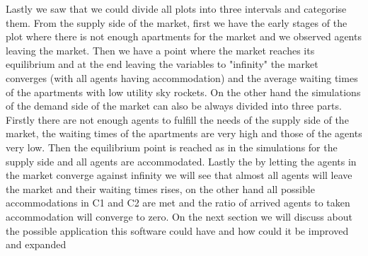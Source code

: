 Lastly we saw that we could divide all plots into three intervals and categorise them. From the supply side of the market, first we have the early stages of the plot where there is not enough apartments for the market and we observed agents leaving the market. Then we have a point where the market reaches its equilibrium and at the end leaving the variables to "infinity" the market converges (with all agents having accommodation) and the average waiting times of the apartments with low utility sky rockets. On the other hand the simulations of the demand side of the market can also be always divided into three parts. Firstly there are not enough agents to fulfill the needs of the supply side of the market, the waiting times of the apartments are very high and those of the agents very low. Then the equilibrium point is reached as in the simulations for the supply side and all agents are accommodated. Lastly the by letting the agents in the market converge against infinity we will see that almost all agents will leave the market and their waiting times rises, on the other hand all possible accommodations in C1 and C2 are met and the ratio of arrived agents to taken accommodation will converge to zero. On the next section we will discuss about the possible application this software could have and how could it be improved and expanded

